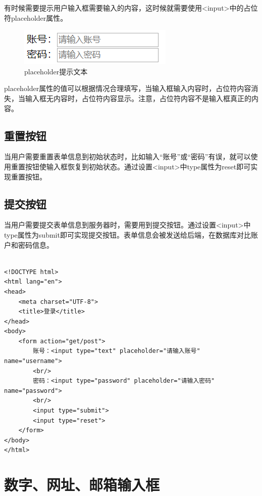 有时候需要提示用户输入框需要输入的内容，这时候就需要使用<input>中的占位符placeholder属性。

\begin{figure}[H]
	\centering
	\includegraphics[]{img/C4/4-3/1.png}
	\caption{placeholder提示文本}
\end{figure}

placeholder属性的值可以根据情况合理填写，当输入框输入内容时，占位符内容消失，当输入框无内容时，占位符内容显示。注意，占位符内容不是输入框真正的内容。

\subsection{重置按钮}

当用户需要重置表单信息到初始状态时，比如输入“账号”或“密码”有误，就可以使用重置按钮使输入框恢复到初始状态。通过设置<input>中type属性为reset即可实现重置按钮。

\subsection{提交按钮}

当用户需要提交表单信息到服务器时，需要用到提交按钮。通过设置<input>中type属性为submit即可实现提交按钮。表单信息会被发送给后端，在数据库对比账户和密码信息。 \\

 \\

\begin{lstlisting}[style=htmlcssjs]
<!DOCTYPE html>
<html lang="en">
<head>
    <meta charset="UTF-8">
    <title>登录</title>
</head>
<body>
    <form action="get/post">
        账号：<input type="text" placeholder="请输入账号" name="username">
        <br/>
        密码：<input type="password" placeholder="请输入密码" name="password">
        <br/>
        <input type="submit">
        <input type="reset">
    </form>
</body>
</html>
\end{lstlisting}

\newpage

\section{数字、网址、邮箱输入框}

